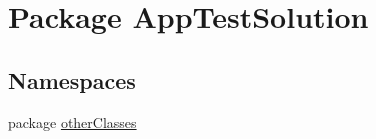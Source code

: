 \hypertarget{namespace_app_test_solution}{\section{Package App\-Test\-Solution}
\label{namespace_app_test_solution}
}
\subsection*{Namespaces}
\begin{DoxyCompactItemize}
\item 
package \hyperlink{namespace_app_test_solution_1_1other_classes}{other\-Classes}
\end{DoxyCompactItemize}
